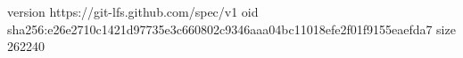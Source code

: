 version https://git-lfs.github.com/spec/v1
oid sha256:e26e2710c1421d97735e3c660802c9346aaa04bc11018efe2f01f9155eaefda7
size 262240
